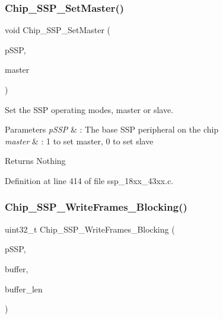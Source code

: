 \subsubsection{\texorpdfstring{Chip\+\_\+\+S\+S\+P\+\_\+\+Set\+Master()}{Chip\_SSP\_SetMaster()}}
{\footnotesize\ttfamily void Chip\+\_\+\+S\+S\+P\+\_\+\+Set\+Master (\begin{DoxyParamCaption}\item[{\hyperlink{struct_l_p_c___s_s_p___t}{L\+P\+C\+\_\+\+S\+S\+P\+\_\+T} $\ast$}]{p\+S\+SP,  }\item[{bool}]{master }\end{DoxyParamCaption})}



Set the S\+SP operating modes, master or slave. 


\begin{DoxyParams}{Parameters}
{\em p\+S\+SP} & \+: The base S\+SP peripheral on the chip \\
\hline
{\em master} & \+: 1 to set master, 0 to set slave \\
\hline
\end{DoxyParams}
\begin{DoxyReturn}{Returns}
Nothing 
\end{DoxyReturn}


Definition at line 414 of file ssp\+\_\+18xx\+\_\+43xx.\+c.

\mbox{\label{group___s_s_p__18_x_x__43_x_x_ga09fd685c38c8442fb4fc2759c9b8a879}} 
\subsubsection{\texorpdfstring{Chip\+\_\+\+S\+S\+P\+\_\+\+Write\+Frames\+\_\+\+Blocking()}{Chip\_SSP\_WriteFrames\_Blocking()}}
{\footnotesize\ttfamily uint32\+\_\+t Chip\+\_\+\+S\+S\+P\+\_\+\+Write\+Frames\+\_\+\+Blocking (\begin{DoxyParamCaption}\item[{\hyperlink{struct_l_p_c___s_s_p___t}{L\+P\+C\+\_\+\+S\+S\+P\+\_\+T} $\ast$}]{p\+S\+SP,  }\item[{const uint8\+\_\+t $\ast$}]{buffer,  }\item[{uint32\+\_\+t}]{buffer\+\_\+len }\end{DoxyParamCaption})}



